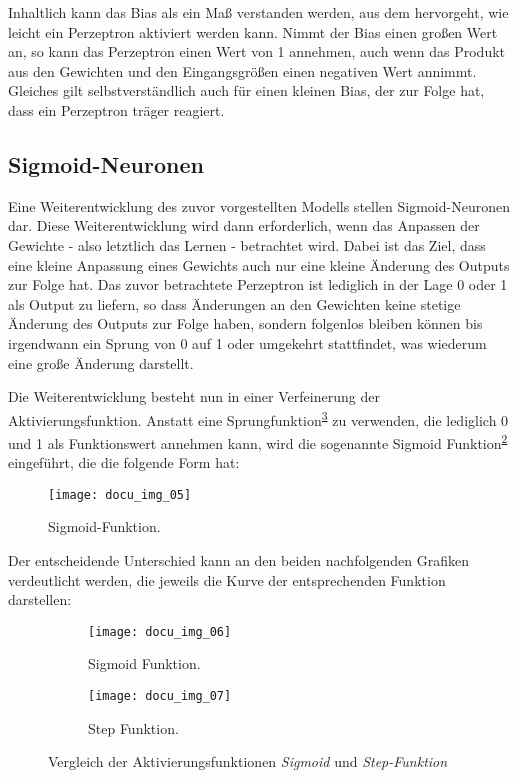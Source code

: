 Inhaltlich kann das Bias als ein Maß verstanden werden, aus dem hervorgeht, wie leicht ein Perzeptron aktiviert
werden kann. Nimmt der Bias einen großen Wert an, so kann das Perzeptron einen Wert von 1 annehmen, auch wenn das
Produkt aus den Gewichten und den Eingangsgrößen einen negativen Wert annimmt. Gleiches gilt selbstverständlich auch für
einen kleinen Bias, der zur Folge hat, dass ein Perzeptron träger reagiert.

\subsection{Sigmoid-Neuronen}

Eine Weiterentwicklung des zuvor vorgestellten Modells stellen Sigmoid-Neuronen dar. Diese Weiterentwicklung wird
dann erforderlich, wenn das Anpassen der Gewichte - also letztlich das Lernen - betrachtet wird. Dabei ist das Ziel,
dass eine kleine Anpassung eines Gewichts auch nur eine kleine Änderung des Outputs zur Folge hat. Das zuvor
betrachtete Perzeptron ist lediglich in der Lage 0 oder 1 als Output zu liefern, so dass Änderungen an den Gewichten
keine stetige Änderung des Outputs zur Folge haben, sondern folgenlos bleiben können bis irgendwann ein Sprung von 0
auf 1 oder umgekehrt stattfindet, was wiederum eine große Änderung darstellt.

Die Weiterentwicklung besteht nun in einer Verfeinerung der Aktivierungsfunktion. Anstatt eine Sprungfunktion\textsuperscript{\ref{fig:step-function}} zu
verwenden, die lediglich 0 und 1 als Funktionswert annehmen kann, wird die sogenannte Sigmoid Funktion\textsuperscript{\ref{fig:sigmoid-function}} eingeführt,
die die folgende Form hat:

\begin{figure}[h]
    \centering
    \texttt{[image: docu\_img\_05]}
    \caption{Sigmoid-Funktion.}
    \label{fig:sigmoid}
\end{figure}

Der entscheidende Unterschied kann an den beiden nachfolgenden Grafiken verdeutlicht werden, die jeweils die Kurve
der entsprechenden Funktion darstellen:

\captionsetup[subfigure]{labelformat=empty, labelsep=none}
\begin{figure}[h]
    \centering
    \begin{subfigure}{0.45\textwidth}
		\texttt{[image: docu\_img\_06]}
		\caption{\tiny{Sigmoid Funktion.}}
		\label{fig:sigmoid-function}
	\end{subfigure}
    \begin{subfigure}{0.45\textwidth}
		\texttt{[image: docu\_img\_07]}
		\caption{\tiny{Step Funktion.}}
		\label{fig:step-function}
	\end{subfigure}

    \caption{Vergleich der Aktivierungsfunktionen \textit{Sigmoid} und \textit{Step-Funktion}}
    \label{fig:activation-functions}
\end{figure}

